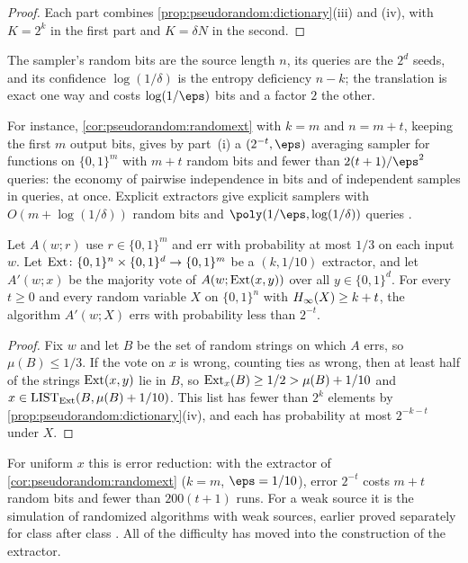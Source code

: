 \begin{refsection}
\begin{proof}
Each part combines \cref{prop:pseudorandom:dictionary}(iii) and (iv), with $K=2^k$ in the first part and $K=\delta N$ in the second.
\end{proof}

The sampler's random bits are the source length $n$, its queries are the $2^d$ seeds, and its confidence $\log(1/\delta)$ is the entropy deficiency $n-k$; the translation is exact one way and costs $\log(1/\eps)$ bits and a factor $2$ the other.

For instance, \cref{cor:pseudorandom:randomext} with $k=m$ and $n=m+t$, keeping the first $m$ output bits, gives by part~(i) a $(2^{-t},\eps)$ averaging sampler for functions on $\{0,1\}^m$ with $m+t$ random bits and fewer than $2(t+1)/\eps^2$ queries: the economy of pairwise independence in bits and of independent samples in queries, at once. Explicit extractors give explicit samplers with $O(m+\log(1/\delta))$ random bits and $\poly(1/\eps,\log(1/\delta))$ queries \parencite[Table~8.1]{Vadhan2012}.

\begin{corollary}\label{cor:pseudorandom:amplify}
Let $A(w;r)$ use $r\in\{0,1\}^m$ and err with probability at most $1/3$ on each input $w$. Let $\operatorname{Ext}\colon\{0,1\}^n\times\{0,1\}^d\to\{0,1\}^m$ be a $(k,1/10)$ extractor, and let $A'(w;x)$ be the majority vote of $A(w;\operatorname{Ext}(x,y))$ over all $y\in\{0,1\}^d$. For every $t\ge0$ and every random variable $X$ on $\{0,1\}^n$ with $H_{\infty}(X)\ge k+t$, the algorithm $A'(w;X)$ errs with probability less than $2^{-t}$.
\end{corollary}

\begin{proof}
Fix $w$ and let $B$ be the set of random strings on which $A$ errs, so $\mu(B)\le1/3$. If the vote on $x$ is wrong, counting ties as wrong, then at least half of the strings $\operatorname{Ext}(x,y)$ lie in $B$, so $\operatorname{Ext}_x(B)\ge1/2>\mu(B)+1/10$ and $x\in\mathrm{LIST}_{\operatorname{Ext}}(B,\mu(B)+1/10)$. This list has fewer than $2^k$ elements by \cref{prop:pseudorandom:dictionary}(iv), and each has probability at most $2^{-k-t}$ under $X$.
\end{proof}

For uniform $x$ this is error reduction: with the extractor of \cref{cor:pseudorandom:randomext} ($k=m$, $\eps=1/10$), error $2^{-t}$ costs $m+t$ random bits and fewer than $200(t+1)$ runs. For a weak source it is the simulation of randomized algorithms with weak sources, earlier proved separately for class after class \parencite[\S6.5]{Vadhan2012}. All of the difficulty has moved into the construction of the extractor.


\end{refsection}
